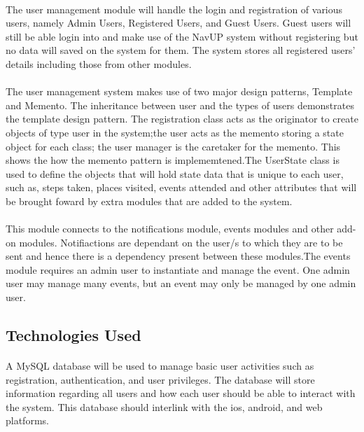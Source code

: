 \documentclass{article}
\begin{document}
\paragraph{}The user management module will handle the login and registration of various users, namely Admin Users, Registered Users, and Guest Users. Guest users will still be able login into and make use of the NavUP system without registering but no data will saved on the system for them. The system stores all registered users' details including those from other modules.

\paragraph{}The user management system makes use of two major design patterns, Template and Memento. The inheritance between user and the types of users demonstrates the template design pattern. The registration class acts as the originator to create objects of type user in the system;the user acts as the memento storing a state object for each class; the user manager is the caretaker for the memento. This shows the how the memento pattern is implememtened.The UserState class is used to define the objects that will hold state data that is unique to each user, such as, steps taken, places visited, events attended and other attributes that will be brought foward by extra modules that are added to the system.

\paragraph{}This module connects to the notifications module, events modules and other add-on modules. Notifiactions are dependant on the user/s to which they are to be sent and hence there is a dependency present between these modules.The events module requires an admin user to instantiate and manage the event. One admin user may manage many events, but an event may only be managed by one admin user. 

\subsection{Technologies Used}
\paragraph{}A MySQL database will be used to manage basic user activities such as registration, authentication, and user privileges. The database will store information regarding all users and how each user should be able to interact with the system. This database should interlink with the ios, android, and web platforms.
\end{document}
